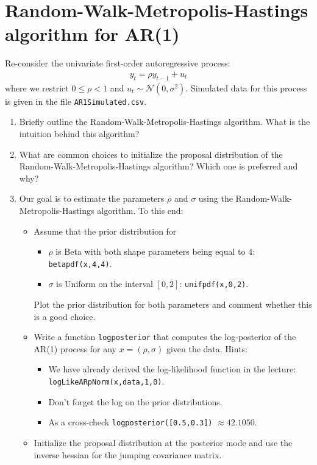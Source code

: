 \documentclass{article}
\begin{document}
\section{Random-Walk-Metropolis-Hastings algorithm for AR(1)}
Re-consider the univariate first-order autoregressive process:
\begin{align*}
	y_t = \rho y_{t-1} + u_t
\end{align*}
where we restrict \(0\leq \rho <1\) and \(u_t \sim \mathcal{N}(0,\sigma^2)\).
Simulated data for this process is given in the file \texttt{AR1Simulated.csv}.
\begin{enumerate}
	\item Briefly outline the Random-Walk-Metropolis-Hastings algorithm.
	What is the intuition behind this algorithm?
	\item What are common choices to initialize the proposal distribution of the Random-Walk-Metropolis-Hastings algorithm?
	Which one is preferred and why?
	\item Our goal is to estimate the parameters \(\rho \) and \(\sigma \) using the Random-Walk-Metropolis-Hastings algorithm.
	To this end:
	\begin{itemize}
		\item Assume that the prior distribution for
		\begin{itemize}
			\item \(\rho \) is Beta with both shape parameters being equal to 4: \texttt{betapdf(x,4,4)}.
			\item \(\sigma \) is Uniform on the interval \([0,2]\): \texttt{unifpdf(x,0,2)}.
		\end{itemize}
		Plot the prior distribution for both parameters and comment whether this is a good choice.
		\item Write a function \texttt{logposterior} that computes the log-posterior of the AR(1) process for any \(x=(\rho,\sigma)\) given the data.
		Hints:
		\begin{itemize}
			\item We have already derived the log-likelihood function in the lecture:\\\texttt{logLikeARpNorm(x,data,1,0)}.
			\item Don't forget the log on the prior distributions.
			\item As a cross-check \texttt{logposterior([0.5,0.3])} \(\approx 42.1050\).
		\end{itemize}		
		\item Initialize the proposal distribution at the posterior mode and use the inverse hessian for the jumping covariance matrix.

\end{itemize}
\end{enumerate}
\end{document}
